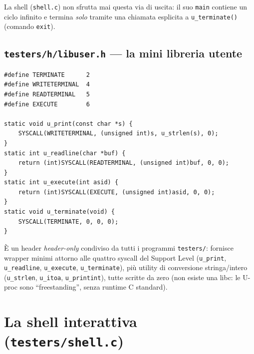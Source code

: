 \documentclass[11pt,a4paper]{article}
\newcommand{\code}[1]{\texttt{#1}}
\begin{document}
La shell (\code{shell.c}) non sfrutta mai questa via di uscita: il suo
\code{main} contiene un ciclo infinito e termina \emph{solo} tramite una
chiamata esplicita a \code{u\_terminate()} (comando \code{exit}).

\subsection{\code{testers/h/libuser.h} --- la mini libreria utente}
\begin{lstlisting}
#define TERMINATE      2
#define WRITETERMINAL  4
#define READTERMINAL   5
#define EXECUTE        6

static void u_print(const char *s) {
    SYSCALL(WRITETERMINAL, (unsigned int)s, u_strlen(s), 0);
}
static int u_readline(char *buf) {
    return (int)SYSCALL(READTERMINAL, (unsigned int)buf, 0, 0);
}
static int u_execute(int asid) {
    return (int)SYSCALL(EXECUTE, (unsigned int)asid, 0, 0);
}
static void u_terminate(void) {
    SYSCALL(TERMINATE, 0, 0, 0);
}
\end{lstlisting}
\`E un header \emph{header-only} condiviso da tutti i programmi
\code{testers/}: fornisce wrapper minimi attorno alle quattro syscall del
Support Level
(\code{u\_print}, \code{u\_readline}, \code{u\_execute},
\code{u\_terminate}), più utility di conversione stringa/intero
(\code{u\_strlen}, \code{u\_itoa}, \code{u\_printint}), tutte scritte da
zero (non esiste una libc: le U-proc sono ``freestanding'', senza
runtime C standard).

\section{La shell interattiva (\code{testers/shell.c})}
\end{document}
